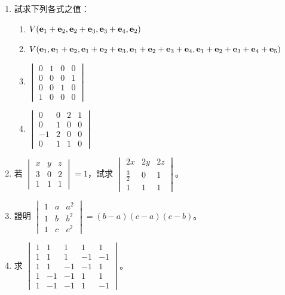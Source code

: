 \begin{enumerate}[label=\arabic*., leftmargin=2em]
  \item 試求下列各式之值：
  \begin{enumerate}[label=(\roman*)]
    \item $V(\boldsymbol{\mathbf{e}}_1+\boldsymbol{\mathbf{e}}_2, \boldsymbol{\mathbf{e}}_2+\boldsymbol{\mathbf{e}}_3, \boldsymbol{\mathbf{e}}_3+\boldsymbol{\mathbf{e}}_4, \boldsymbol{\mathbf{e}}_2)$
    \item $V(\boldsymbol{\mathbf{e}}_1, \boldsymbol{\mathbf{e}}_1+\boldsymbol{\mathbf{e}}_2, \boldsymbol{\mathbf{e}}_1+\boldsymbol{\mathbf{e}}_2+\boldsymbol{\mathbf{e}}_3, \boldsymbol{\mathbf{e}}_1+\boldsymbol{\mathbf{e}}_2+\boldsymbol{\mathbf{e}}_3+\boldsymbol{\mathbf{e}}_4, \boldsymbol{\mathbf{e}}_1+\boldsymbol{\mathbf{e}}_2+\boldsymbol{\mathbf{e}}_3+\boldsymbol{\mathbf{e}}_4+\boldsymbol{\mathbf{e}}_5)$
    \item $\begin{vmatrix}
    0 & 1 & 0 & 0 \\
    0 & 0 & 0 & 1 \\
    0 & 0 & 1 & 0 \\
    1 & 0 & 0 & 0
    \end{vmatrix}$
    \item $\begin{vmatrix}
    0 & 0 & 2 & 1 \\
    0 & 1 & 0 & 0 \\
    -1 & 2 & 0 & 0 \\
    0 & 1 & 1 & 0
    \end{vmatrix}$
  \end{enumerate}

  \item 若 $\begin{vmatrix} x & y & z \\ 3 & 0 & 2 \\ 1 & 1 & 1 \end{vmatrix} = 1$，試求 $\begin{vmatrix} 2x & 2y & 2z \\ \frac{3}{2} & 0 & 1 \\ 1 & 1 & 1 \end{vmatrix}$。

  \item 證明 $\begin{vmatrix} 1 & a & a^2 \\ 1 & b & b^2 \\ 1 & c & c^2 \end{vmatrix} = (b-a)(c-a)(c-b)$。

  \item 求 $\begin{vmatrix}
  1 & 1 & 1 & 1 & 1 \\
  1 & 1 & 1 & -1 & -1 \\
  1 & 1 & -1 & -1 & 1 \\
  1 & -1 & -1 & 1 & 1 \\
  1 & -1 & -1 & 1 & -1
  \end{vmatrix}$。


\end{enumerate}
